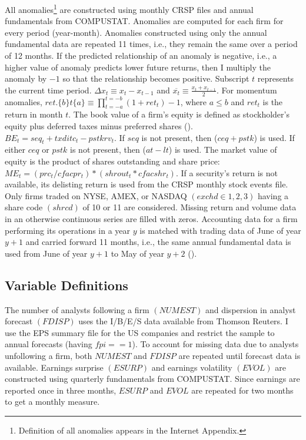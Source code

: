 \documentclass[
  12pt,
  a4paper,
  twoside,
  onecolumn]{article}
\begin{document}
All anomalies\footnote{Definition of all anomalies appears in the
  Internet Appendix.} are constructed using monthly CRSP files and
annual fundamentals from COMPUSTAT. Anomalies are computed for each firm
for every period (year-month). Anomalies constructed using only the
annual fundamental data are repeated 11 times, i.e., they remain the
same over a period of 12 months. If the predicted relationship of an
anomaly is negative, i.e., a higher value of anomaly predicts lower
future returns, then I multiply the anomaly by \(-1\) so that the
relationship becomes positive. Subscript \(t\) represents the current
time period. \(\Delta x_t \equiv x_t - x_{t-1}\) and
\(\overline{x_t} \equiv \frac{x_t + x_{t-1}}{2}\). For momentum
anomalies, \(ret.\{b\}t\{a\} \equiv \prod_{t=-a}^{t=-b} (1+ret_t)-1\),
where \(a \leq b\) and \(ret_t\) is the return in month \(t\). The book
value of a firm's equity is defined as stockholder's equity plus
deferred taxes minus preferred shares (\cite{fama_french1992}).
\(BE_t = seq_t + txditc_t - pstkrv_t\). If \(seq\) is not present, then
(\(ceq + pstk\)) is used. If either \(ceq\) or \(pstk\) is not present,
then (\(at - lt\)) is used. The market value of equity is the product of
shares outstanding and share price:
\(ME_t = (prc_t / cfacpr_t ) * (shrout_t * cfacshr_t)\). If a security's
return is not available, its delisting return is used from the CRSP
monthly stock events file. Only firms traded on NYSE, AMEX, or NASDAQ
\((exchd \in {1,2,3})\) having a share code \((shrcd)\) of 10 or 11 are
considered. Missing return and volume data in an otherwise continuous
series are filled with zeros. Accounting data for a firm performing its
operations in a year \(y\) is matched with trading data of June of year
\(y+1\) and carried forward 11 months, i.e., the same annual fundamental
data is used from June of year \(y+1\) to May of year \(y+2\)
(\cite{fama_french1992}).

\hypertarget{appendix-a2-variable-definitions}{%
\subsection{Variable
Definitions}\label{appendix-a2-variable-definitions}}

The number of analysts following a firm \((NUMEST)\) and dispersion in
analyst forecast \((FDISP)\) uses the I/B/E/S data available from
Thomson Reuters. I use the EPS summary file for the US companies and
restrict the sample to annual forecasts (having \(fpi==1\)). To account
for missing data due to analysts unfollowing a firm, both \(NUMEST\) and
\(FDISP\) are repeated until forecast data is available. Earnings
surprise \((ESURP)\) and earnings volatility \((EVOL)\) are constructed
using quarterly fundamentals from COMPUSTAT. Since earnings are reported
once in three months, \(ESURP\) and \(EVOL\) are repeated for two months
to get a monthly measure.
\end{document}
